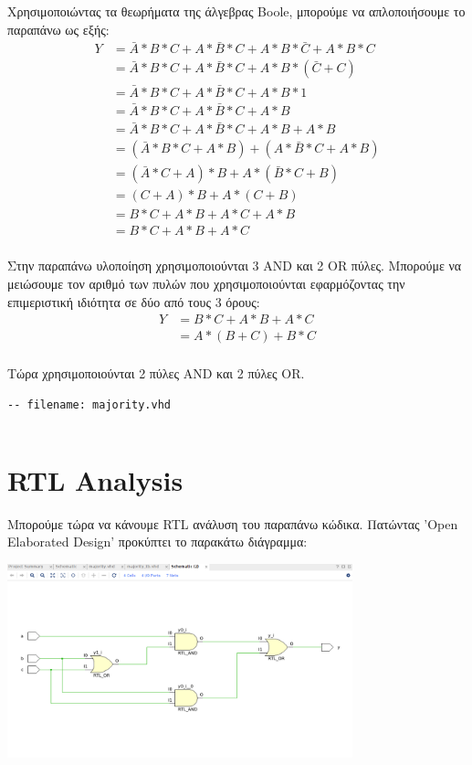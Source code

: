 \documentclass[]{article}
\begin{document}
Χρησιμοποιώντας τα θεωρήματα της άλγεβρας Boole, μπορούμε να απλοποιήσουμε το παραπάνω ως εξής:
\begin{align*}
	Y & = \bar{A} * B * C + A * \bar{B} * C + A * B * \bar{C} + A * B * C \\
	  & = \bar{A} * B * C + A * \bar{B} * C + A * B * (\bar{C} + C)       \\
	  & = \bar{A} * B * C + A * \bar{B} * C + A * B * 1                   \\
	  & = \bar{A} * B * C + A * \bar{B} * C + A * B                       \\
	  & = \bar{A} * B * C + A * \bar{B} * C + A * B + A * B               \\
	  & = (\bar{A} * B * C + A * B) + (A * \bar{B} * C + A * B)           \\
	  & = (\bar{A} * C + A) * B + A * (\bar{B} * C + B)                   \\
	  & = (C + A) * B + A * (C + B)                                       \\
	  & = B * C + A * B + A * C + A * B                                   \\
	  & = B * C + A * B + A * C                                           \\
\end{align*}

Στην παραπάνω υλοποίηση χρησιμοποιούνται 3 AND και 2 OR πύλες. Μπορούμε να μειώσουμε τον αριθμό των πυλών που χρησιμοποιούνται εφαρμόζοντας την επιμεριστική ιδιότητα σε δύο από τους 3 όρους:
\begin{align*}
	Y & = B * C + A * B + A * C \\
	  & = A * (B + C) + B * C   \\
\end{align*}

Τώρα χρησιμοποιούνται 2 πύλες AND και 2 πύλες OR.
\begin{verbatim}
-- filename: majority.vhd
\end{verbatim}
\inputminted{vhdl}{./assign_1/majority_old.vhdl}

\section{RTL Analysis}
Μπορούμε τώρα να κάνουμε RTL ανάλυση του παραπάνω κώδικα. Πατώντας 'Open Elaborated Design'
προκύπτει το παρακάτω διάγραμμα:
\begin{center}
	\includegraphics[width=10cm]{rtl_schem.png}
\end{center}
\end{document}
